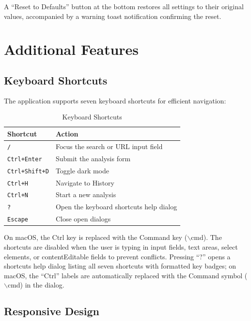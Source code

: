 A ``Reset to Defaults'' button at the bottom restores all settings to their original values, accompanied by a warning toast notification confirming the reset.

\section{Additional Features}

\subsection{Keyboard Shortcuts}

The application supports seven keyboard shortcuts for efficient navigation:

\begin{table}[htbp]
\centering
\caption{Keyboard Shortcuts}
\label{tab:keyboard_shortcuts}
\begin{tabular}{ll}
\toprule
\textbf{Shortcut} & \textbf{Action} \\
\midrule
\texttt{/} & Focus the search or URL input field \\
\texttt{Ctrl+Enter} & Submit the analysis form \\
\texttt{Ctrl+Shift+D} & Toggle dark mode \\
\texttt{Ctrl+H} & Navigate to History \\
\texttt{Ctrl+N} & Start a new analysis \\
\texttt{?} & Open the keyboard shortcuts help dialog \\
\texttt{Escape} & Close open dialogs \\
\bottomrule
\end{tabular}
\end{table}

On macOS, the Ctrl key is replaced with the Command key ($\backslash$cmd). The shortcuts are disabled when the user is typing in input fields, text areas, select elements, or contentEditable fields to prevent conflicts. Pressing ``?'' opens a shortcuts help dialog listing all seven shortcuts with formatted key badges; on macOS, the ``Ctrl'' labels are automatically replaced with the Command symbol ($\backslash$cmd) in the dialog.

\subsection{Responsive Design}

